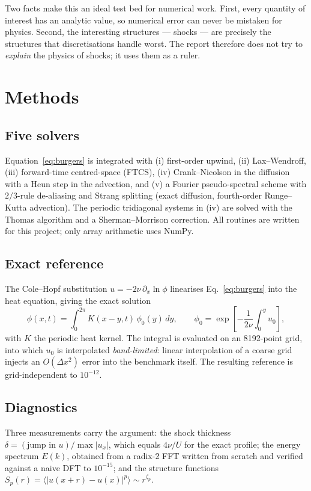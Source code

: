 \documentclass[10pt,a4paper]{article}
\newcommand{\deltash}{\delta}
\begin{document}
Two facts make this an ideal test bed for numerical work. First, every
quantity of interest has an analytic value, so numerical error can never be
mistaken for physics. Second, the interesting structures --- shocks --- are
precisely the structures that discretisations handle worst. The report
therefore does not try to \emph{explain} the physics of shocks; it uses them as
a ruler.

\section{Methods}

\subsection*{Five solvers}
Equation~\eqref{eq:burgers} is integrated with (i) first-order upwind,
(ii) Lax--Wendroff, (iii) forward-time centred-space (FTCS), (iv) Crank--Nicolson
in the diffusion with a Heun step in the advection, and (v) a Fourier
pseudo-spectral scheme with $2/3$-rule de-aliasing and Strang splitting (exact
diffusion, fourth-order Runge--Kutta advection). The periodic tridiagonal systems
in (iv) are solved with the Thomas algorithm and a Sherman--Morrison correction.
All routines are written for this project; only array arithmetic uses NumPy.

\subsection*{Exact reference}
The Cole--Hopf substitution $u=-2\nu\,\partial_x\ln\phi$ linearises
Eq.~\eqref{eq:burgers} into the heat equation, giving the exact solution
\begin{equation}
  \phi(x,t)=\int_0^{2\pi} K(x-y,t)\,\phi_0(y)\,dy,\qquad
  \phi_0 = \exp\!\left[-\frac{1}{2\nu}\int_0^y u_0\right],
  \label{eq:colehopf}
\end{equation}
with $K$ the periodic heat kernel. The integral is evaluated on an 8192-point
grid, into which $u_0$ is interpolated \emph{band-limited}: linear interpolation
of a coarse grid injects an $O(\Delta x^2)$ error into the benchmark itself.
The resulting reference is grid-independent to $10^{-12}$.

\subsection*{Diagnostics}
Three measurements carry the argument: the shock thickness
$\deltash=(\text{jump in }u)/\max|u_x|$, which equals $4\nu/U$ for the exact
profile; the energy spectrum $E(k)$, obtained from a radix-2 FFT written from
scratch and verified against a naive DFT to $10^{-15}$; and the structure
functions $S_p(r)=\langle|u(x+r)-u(x)|^p\rangle\sim r^{\zeta_p}$.
\end{document}
